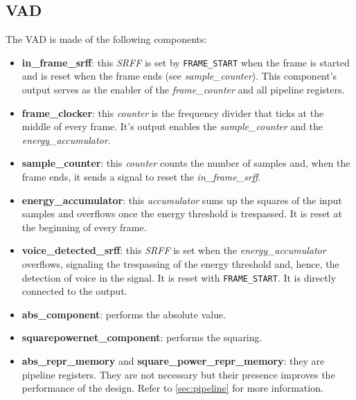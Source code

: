\subsection{VAD}
The VAD is made of the following components:
\begin{itemize}
  \item \textbf{in\_frame\_srff}: this \emph{SRFF} is set by \texttt{FRAME\_START} when
    the frame is started and is reset when the frame ends (see \emph{sample\_counter}).
    This component's output serves as the enabler of the \emph{frame\_counter}
    and all pipeline registers.
  \item \textbf{frame\_clocker}: this \emph{counter} is the frequency divider
    that ticks at the middle of every frame. It's output enables the
    \emph{sample\_counter} and the \emph{energy\_accumulator}.
  \item \textbf{sample\_counter}: this \emph{counter} counts the number of samples
    and, when the frame ends, it sends a signal to reset the \emph{in\_frame\_srff}.
  \item \textbf{energy\_accumulator}: this \emph{accumulator} sums up the
    squares of the input samples and overflows once the energy threshold is
    trespassed. It is reset at the beginning of every frame.
  \item \textbf{voice\_detected\_srff}: this \emph{SRFF} is set when the
    \emph{energy\_accumulator} overflows, signaling the trespassing of the
    energy threshold and, hence, the detection of voice in the signal. It is
    reset with \texttt{FRAME\_START}. It is directly connected to the output.
  \item \textbf{abs\_component}: performs the absolute value.
  \item \textbf{squarepowernet\_component}: performs the squaring.
  \item \textbf{abs\_repr\_memory} and \textbf{square\_power\_repr\_memory}:
    they are pipeline registers. They are not necessary but their presence
    improves the performance of the design. Refer to \cref{sec:pipeline} for
    more information.
\end{itemize}

